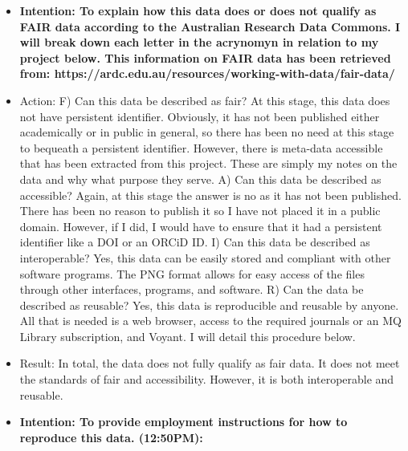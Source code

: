 \documentclass[a4paper,12pt]{article}
\begin{document}
\begin{itemize}
\item \textbf{Intention: To explain how this data does or does not qualify as FAIR data according to the Australian Research Data Commons. I will break down each letter in the acrynomyn in relation to my project below. This information on FAIR data has been retrieved from: https://ardc.edu.au/resources/working-with-data/fair-data/}

\item Action: F) Can this data be described as fair? At this stage, this data does not have persistent identifier. Obviously, it has not been published either academically or in public in general, so there has been no need at this stage to bequeath a persistent identifier. However, there is meta-data accessible that has been extracted from this project. These are simply my notes on the data and why what purpose they serve. A) Can this data be described as accessible? Again, at this stage the answer is no as it has not been published. There has been no reason to publish it so I have not placed it in a public domain. However, if I did, I would have to ensure that it had a persistent identifier like a DOI or an ORCiD ID. I) Can this data be described as interoperable? Yes, this data can be easily stored and compliant with other software programs. The PNG format allows for easy access of the files through other interfaces, programs, and software. R) Can the data be described as reusable? Yes, this data is reproducible and reusable by anyone. All that is needed is a web browser, access to the required journals or an MQ Library subscription, and Voyant. I will detail this procedure below. 


\item Result: In total, the data does not fully qualify as fair data. It does not meet the standards of fair and accessibility. However, it is both interoperable and reusable. 


\item \textbf{Intention: To provide employment instructions for how to reproduce this data. (12:50PM):}



\end{itemize}
\end{document}
